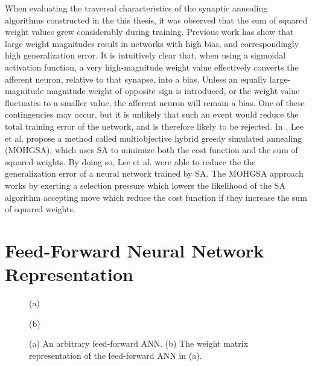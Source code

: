 \documentclass[11pt]{afthesis}
\begin{document}
	When evaluating the traversal characteristics of the synaptic annealing algorithms constructed in the this thesis, it was observed that the sum of squared weight values grew considerably during training. Previous work \cite{} has show that large weight magnitudes result in networks with high bias, and correspondingly high generalization error. It is intuitively clear that, when using a sigmoidal activation function, a very high-magnitude weight value effectively converts the afferent neuron, relative to that synapse, into a bias. Unless an equally large-magnitude magnitude weight of opposite sign is introduced, or the weight value fluctuates to a smaller value, the afferent neuron will remain a bias. One of these contingencies may occur, but it is unlikely that such an event would reduce the total training error of the network, and is therefore likely to be rejected. In \cite{lee2007improvinggeneralizationcapabilitynnusingsa}, Lee et al. propose a method called multiobjective hybrid greedy simulated annealing (MOHGSA), which uses SA to minimize both the cost function and the sum of squared weights. By doing so, Lee et al. were able to reduce the the generalization error of a neural network trained by SA. The MOHGSA approach works by exerting a selection pressure which lowers the likelihood of the SA algorithm accepting move which reduce the cost function if they increase the sum of squared weights. 
	
	
	\section{Feed-Forward Neural Network Representation}
	\label{scn:feed_forward_neural_network_representation}
	\begin{figure}[ht!]
		
		\begin{minipage}[b]{0.48\linewidth}
			\centering
			\centerline{}
			\centerline{(a)}\medskip
		\end{minipage}
		\hfill
		\begin{minipage}[b]{0.48\linewidth}
			\centering
			\centerline{}
			\centerline{(b)}\medskip
		\end{minipage}
		\caption{
			(a) An arbitrary feed-forward ANN.
			(b) The weight matrix representation of the feed-forward ANN in (a).}
		\label{fig:nettomatmapping}
		
	\end{figure}
	
\end{document}
